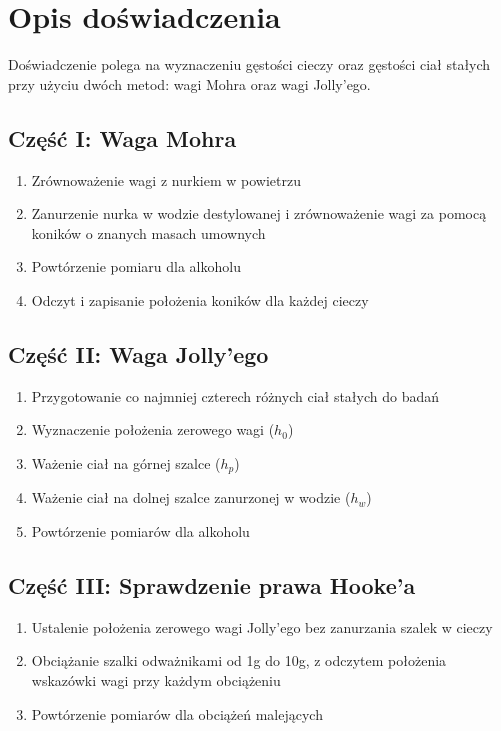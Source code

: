 \documentclass[a4paper,12pt]{article}
\begin{document}
\section{Opis doświadczenia}

Doświadczenie polega na wyznaczeniu gęstości cieczy oraz gęstości ciał stałych przy użyciu dwóch metod: wagi Mohra oraz wagi Jolly'ego.

\subsection*{Część I: Waga Mohra}
\begin{enumerate}
    \setlength{\itemsep}{0em}
    \item Zrównoważenie wagi z nurkiem w powietrzu
    \item Zanurzenie nurka w wodzie destylowanej i zrównoważenie wagi za pomocą koników o znanych masach umownych
    \item Powtórzenie pomiaru dla alkoholu
    \item Odczyt i zapisanie położenia koników dla każdej cieczy
\end{enumerate}

\subsection*{Część II: Waga Jolly'ego}
\begin{enumerate}
    \setlength{\itemsep}{0em}
    \item Przygotowanie co najmniej czterech różnych ciał stałych do badań
    \item Wyznaczenie położenia zerowego wagi ($h_0$)
    \item Ważenie ciał na górnej szalce ($h_p$)
    \item Ważenie ciał na dolnej szalce zanurzonej w wodzie ($h_w$)
    \item Powtórzenie pomiarów dla alkoholu
\end{enumerate}

\subsection*{Część III: Sprawdzenie prawa Hooke'a}
\begin{enumerate}
    \setlength{\itemsep}{0em}
    \item Ustalenie położenia zerowego wagi Jolly'ego bez zanurzania szalek w cieczy
    \item Obciążanie szalki odważnikami od 1g do 10g, z odczytem położenia wskazówki wagi przy każdym obciążeniu
    \item Powtórzenie pomiarów dla obciążeń malejących
\end{enumerate}
\end{document}
